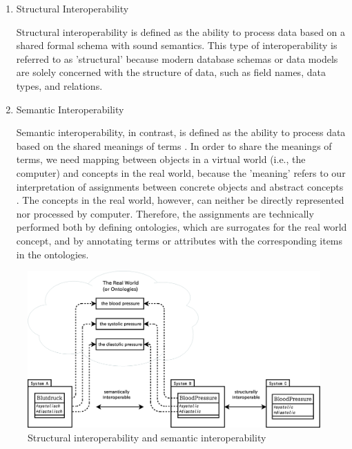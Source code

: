 \documentclass[preprint,3p,onecolumn,times,review]{article}
\begin{document}
\begin{enumerate}
\item Structural Interoperability
  
  Structural interoperability is defined as the ability to process data based on a shared formal schema with sound semantics. 
  This type of interoperability is referred to as 'structural' because modern database schemas or data models are solely concerned with the structure of data, such as field names, data types, and relations.
\item Semantic Interoperability

  Semantic interoperability, in contrast, is defined as the ability to process data based on the shared meanings of terms \cite{veltman01:_syntac_seman_inter,sebastian09:_towar_seman_inter_for_elect_healt_recor,maldonado07:_framew_for_clinic_data_stand_based_archet,martinez-costa10:_iso_en_openeh,jose09:_linkeh_ed}.
  In order to share the meanings of terms, we need mapping between objects in a virtual world (i.e., the computer) and concepts in the real world, because the 'meaning' refers to our interpretation of assignments between concrete objects and abstract concepts \cite[p.97]{hakimpour05:_resol_seman_heter_datab_schem}.
  The concepts in the real world, however, can neither be directly represented nor processed by computer.
  Therefore, the assignments are technically performed both by defining ontologies, which are surrogates for the real world concept, and by annotating terms or attributes with the corresponding items in the ontologies.
\end{enumerate}

\begin{figure}[!htbp]
  \begin{center}
    \includegraphics[width=12cm]{meaning_of_semantic.eps}  
  \end{center}
  \caption{Structural interoperability and semantic interoperability}\label{fig:meaning_of_semantic}
\end{figure}
\end{document}
